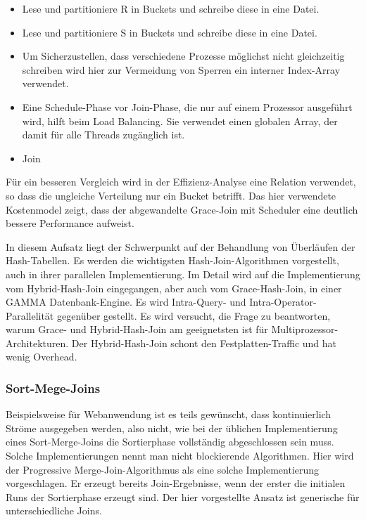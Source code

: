 \documentclass[a4paper,12pt,twoside]{article}
\begin{document}
\begin{itemize}
	\item Lese und partitioniere R in Buckets und schreibe diese in eine Datei.
	\item Lese und partitioniere S in Buckets und schreibe diese in eine Datei.
	\item Um Sicherzustellen, dass verschiedene Prozesse möglichst nicht gleichzeitig schreiben wird hier zur Vermeidung von Sperren ein interner Index-Array verwendet.
	\item Eine Schedule-Phase vor Join-Phase, die nur auf einem Prozessor ausgeführt wird, hilft beim Load Balancing. Sie verwendet einen globalen Array, der damit für alle Threads zugänglich ist.
	\item Join
\end{itemize}

Für ein besseren Vergleich wird in der Effizienz-Analyse eine Relation verwendet, so dass die ungleiche Verteilung nur ein Bucket betrifft. Das hier verwendete Kostenmodel zeigt, dass der abgewandelte Grace-Join mit Scheduler eine deutlich bessere Performance aufweist. 

\textbf{}

In diesem Aufsatz liegt der Schwerpunkt auf der Behandlung von Überläufen der Hash-Tabellen. Es werden die wichtigsten Hash-Join-Algorithmen vorgestellt, auch in ihrer parallelen Implementierung. Im Detail wird auf die Implementierung vom Hybrid-Hash-Join eingegangen, aber auch vom Grace-Hash-Join, in einer GAMMA Datenbank-Engine. Es wird Intra-Query- und Intra-Operator-Parallelität gegenüber gestellt. Es wird versucht, die Frage zu beantworten, warum Grace- und Hybrid-Hash-Join am geeignetsten ist für Multiprozessor-Architekturen. Der Hybrid-Hash-Join schont den Festplatten-Traffic und hat wenig Overhead. 

\subsubsection{Sort-Mege-Joins}
\textbf{}

Beispielsweise für Webanwendung ist es teils gewünscht, dass kontinuierlich Ströme ausgegeben werden, also nicht, wie bei der üblichen Implementierung eines Sort-Merge-Joins die Sortierphase vollständig abgeschlossen sein muss. Solche Implementierungen nennt man nicht blockierende Algorithmen. Hier wird der Progressive Merge-Join-Algorithmus als eine solche Implementierung vorgeschlagen. Er erzeugt bereits Join-Ergebnisse, wenn der erster die initialen Runs der Sortierphase erzeugt sind. Der hier vorgestellte Ansatz ist generische für unterschiedliche Joins.
\end{document}
